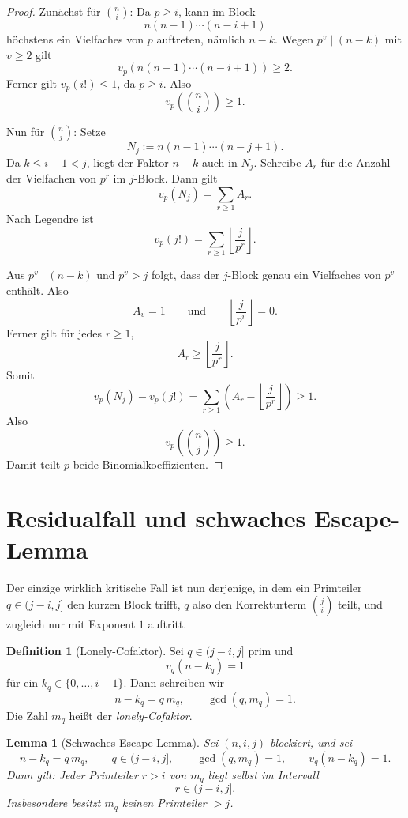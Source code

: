 \documentclass[12pt,a4paper]{article}
\theoremstyle{plain}
\newtheorem{lemma}[theorem]{Lemma}
\theoremstyle{definition}
\newtheorem{definition}[theorem]{Definition}
\theoremstyle{remark}
\begin{document}
	\begin{proof}
		Zunächst für \(\binom ni\): Da \(p\ge i\), kann im Block
		\[
		n(n-1)\cdots(n-i+1)
		\]
		höchstens ein Vielfaches von \(p\) auftreten, nämlich \(n-k\). Wegen \(p^v\mid(n-k)\) mit \(v\ge2\) gilt
		\[
		v_p\!\left(n(n-1)\cdots(n-i+1)\right)\ge2.
		\]
		Ferner gilt \(v_p(i!)\le1\), da \(p\ge i\). Also
		\[
		v_p\!\left(\binom ni\right)\ge1.
		\]
		
		Nun für \(\binom nj\): Setze
		\[
		N_j:=n(n-1)\cdots(n-j+1).
		\]
		Da \(k\le i-1<j\), liegt der Faktor \(n-k\) auch in \(N_j\). Schreibe \(A_r\) für die Anzahl der Vielfachen von \(p^r\) im \(j\)-Block. Dann gilt
		\[
		v_p(N_j)=\sum_{r\ge1} A_r.
		\]
		Nach Legendre ist
		\[
		v_p(j!)=\sum_{r\ge1}\left\lfloor \frac{j}{p^r}\right\rfloor.
		\]
		
		Aus \(p^v\mid(n-k)\) und \(p^v>j\) folgt, dass der \(j\)-Block genau ein Vielfaches von \(p^v\) enthält. Also
		\[
		A_v=1
		\qquad\text{und}\qquad
		\left\lfloor \frac{j}{p^v}\right\rfloor=0.
		\]
		Ferner gilt für jedes \(r\ge1\),
		\[
		A_r\ge \left\lfloor \frac{j}{p^r}\right\rfloor.
		\]
		Somit
		\[
		v_p(N_j)-v_p(j!)
		=
		\sum_{r\ge1}\left(A_r-\left\lfloor \frac{j}{p^r}\right\rfloor\right)\ge1.
		\]
		Also
		\[
		v_p\!\left(\binom nj\right)\ge1.
		\]
		Damit teilt \(p\) beide Binomialkoeffizienten.
	\end{proof}
	
	\section{Residualfall und schwaches Escape-Lemma}
	
	Der einzige wirklich kritische Fall ist nun derjenige, in dem ein Primteiler \(q\in(j-i,j]\) den kurzen Block trifft, \(q\) also den Korrekturterm \(\binom ji\) teilt, und zugleich nur mit Exponent \(1\) auftritt.
	
	\begin{definition}[Lonely-Cofaktor]
		Sei \(q\in(j-i,j]\) prim und
		\[
		v_q(n-k_q)=1
		\]
		für ein \(k_q\in\{0,\dots,i-1\}\). Dann schreiben wir
		\[
		n-k_q=q\,m_q,\qquad \gcd(q,m_q)=1.
		\]
		Die Zahl \(m_q\) heißt der \emph{lonely-Cofaktor}.
	\end{definition}
	
	\begin{lemma}[Schwaches Escape-Lemma]
		\label{lem:weak-escape}
		Sei \((n,i,j)\) blockiert, und sei
		\[
		n-k_q=q\,m_q,\qquad q\in(j-i,j],\qquad \gcd(q,m_q)=1,\qquad v_q(n-k_q)=1.
		\]
		Dann gilt: Jeder Primteiler \(r>i\) von \(m_q\) liegt selbst im Intervall
		\[
		r\in(j-i,j].
		\]
		Insbesondere besitzt \(m_q\) keinen Primteiler \(>j\).
	\end{lemma}
	
\end{document}
